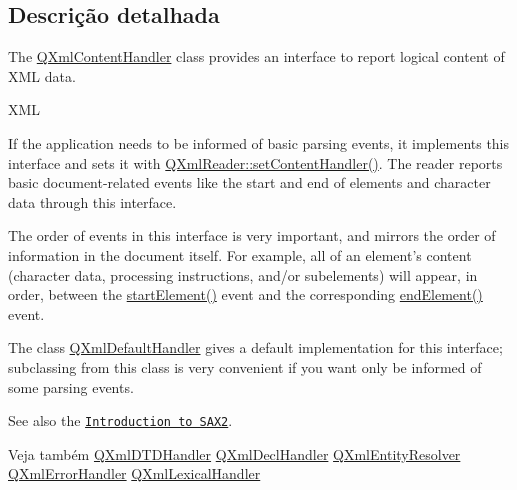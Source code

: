 \subsection{Descrição detalhada}
The \hyperlink{class_q_xml_content_handler}{Q\-Xml\-Content\-Handler} class provides an interface to report logical content of X\-M\-L data. 

X\-M\-L

If the application needs to be informed of basic parsing events, it implements this interface and sets it with \hyperlink{class_q_xml_reader_a481b7b578c8ad3764dc541d9b5fc44ce}{Q\-Xml\-Reader\-::set\-Content\-Handler()}. The reader reports basic document-\/related events like the start and end of elements and character data through this interface.

The order of events in this interface is very important, and mirrors the order of information in the document itself. For example, all of an element's content (character data, processing instructions, and/or subelements) will appear, in order, between the \hyperlink{class_q_xml_content_handler_ac956b69e7f9be94f64e8e90095eb2ce0}{start\-Element()} event and the corresponding \hyperlink{class_q_xml_content_handler_ac85feb837d3634e775cc7c76df84cce0}{end\-Element()} event.

The class \hyperlink{class_q_xml_default_handler}{Q\-Xml\-Default\-Handler} gives a default implementation for this interface; subclassing from this class is very convenient if you want only be informed of some parsing events.

See also the \href{xml.html#introSAX2}{\tt Introduction to S\-A\-X2}.

\begin{DoxySeeAlso}{Veja também}
\hyperlink{class_q_xml_d_t_d_handler}{Q\-Xml\-D\-T\-D\-Handler} \hyperlink{class_q_xml_decl_handler}{Q\-Xml\-Decl\-Handler} \hyperlink{class_q_xml_entity_resolver}{Q\-Xml\-Entity\-Resolver} \hyperlink{class_q_xml_error_handler}{Q\-Xml\-Error\-Handler} \hyperlink{class_q_xml_lexical_handler}{Q\-Xml\-Lexical\-Handler} 
\end{DoxySeeAlso}


